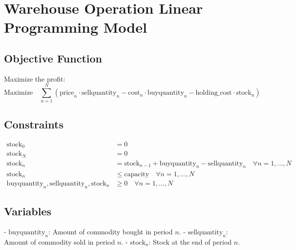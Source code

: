 \documentclass{article}
\begin{document}
\section*{Warehouse Operation Linear Programming Model}

\subsection*{Objective Function}
Maximize the profit:
\[
\text{Maximize} \quad \sum_{n=1}^{N} \left( \text{price}_n \cdot \text{sellquantity}_n - \text{cost}_n \cdot \text{buyquantity}_n - \text{holding\_cost} \cdot \text{stock}_n \right)
\]

\subsection*{Constraints}
\begin{align}
    \text{stock}_0 & = 0 \\
    \text{stock}_N & = 0 \\
    \text{stock}_n & = \text{stock}_{n-1} + \text{buyquantity}_n - \text{sellquantity}_n \quad \forall n = 1, \ldots, N \\
    \text{stock}_n & \leq \text{capacity} \quad \forall n = 1, \ldots, N \\
    \text{buyquantity}_n, \text{sellquantity}_n, \text{stock}_n & \geq 0 \quad \forall n = 1, \ldots, N
\end{align}

\subsection*{Variables}
- \( \text{buyquantity}_n \): Amount of commodity bought in period \( n \).
- \( \text{sellquantity}_n \): Amount of commodity sold in period \( n \).
- \( \text{stock}_n \): Stock at the end of period \( n \).
\end{document}

